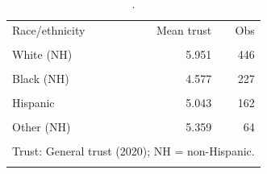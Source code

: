 \begin{table}[htbp]\centering
\caption{.}
\label{tab:trust_mean_by_race_eth_others_2020}
\begin{tabular}{lrr}\toprule
Race/ethnicity & Mean trust & Obs \\\\ \midrule
White (NH) & 5.951 & 446 \\\\
Black (NH) & 4.577 & 227 \\\\
Hispanic & 5.043 & 162 \\\\
Other (NH) & 5.359 & 64 \\\\
\bottomrule
\multicolumn{3}{l}{\footnotesize Trust: General trust (2020); NH = non-Hispanic.} \\\\
\end{tabular}
\end{table}
